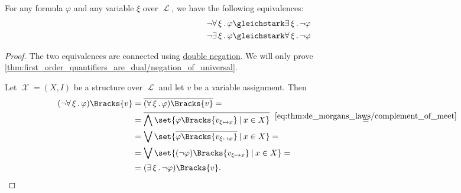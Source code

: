 \begin{proposition}\label{thm:first_order_quantifiers_are_dual}
  For any formula \( \varphi \) and any variable \( \xi \) over \( \mscrL \), we have the following equivalences:
  \begin{align}
    \neg \qforall \xi \varphi &\gleichstark \qexists \xi \neg \varphi \label{thm:first_order_quantifiers_are_dual/negation_of_universal} \\
    \neg \qexists \xi \varphi &\gleichstark \qforall \xi \neg \varphi \label{thm:first_order_quantifiers_are_dual/negation_of_existential}
  \end{align}
\end{proposition}
\begin{proof}
  The two equivalences are connected using \hyperref[thm:boolean_equivalences/double_negation]{double negation}. We will only prove \eqref{thm:first_order_quantifiers_are_dual/negation_of_universal}.

  Let \( \mscrX = (X, I) \) be a structure over \( \mscrL \) and let \( v \) be a variable assignment. Then
  \begin{align*}
    (\neg \qforall \xi \varphi)\Bracks{v}
    &=
    \overline{(\qforall \xi \varphi)\Bracks{v}}
    = \\ &=
    \overline{\bigwedge\set{ \varphi\Bracks{v_{\xi \mapsto x}} \given x \in X }}
    \reloset {\eqref{eq:thm:de_morgans_laws/complement_of_meet}} = \\ &=
    \bigvee\set{ \overline{\varphi\Bracks{v_{\xi \mapsto x}}} \given x \in X }
    = \\ &=
    \bigvee\set{ (\neg \varphi)\Bracks{v_{\xi \mapsto x}} \given x \in X }
    = \\ &=
    (\qexists \xi \neg \varphi)\Bracks{v}.
  \end{align*}
\end{proof}

